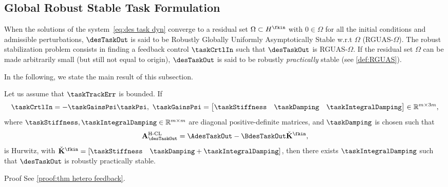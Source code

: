 \subsection{Global Robust Stable Task Formulation}\label{subsec-chap3:Robust task formulation} 
When the solutions of the system~\cref{eq:des task dyn} converge to a residual set $\Omega\subset  H^{\fkin}$ with $0\in\Omega$ for all the initial conditions and admissible perturbations,	$\desTaskOut $ is said to be Robustly Globally Uniformly Asymptotically Stable w.r.t $\Omega$ (RGUAS-$\Omega$). The robust stabilization problem consists in finding a feedback control $\taskCrtlIn$ such that $\desTaskOut $  is RGUAS-$\Omega$. 
If the residual set $\Omega$ can be made arbitrarily small (but still not equal to origin), $\desTaskOut $ is said to be robustly \emph{practically} stable (see \cref{def:RGUAS}).

In the following, we state the main result of this subsection.
\begin{theorem}\label{thm:heterogeneous feedback}
	Let us assume that $\taskTrackErr $ is bounded. If %
	\begin{equation}\label{eq:heterogeneous feedback mu}
		\taskCrtlIn = -\taskGainsPsi\taskPsi, \ \taskGainsPsi =\begin{bmatrix}
			\taskStiffness& 	\taskDamping&  \taskIntegralDamping
		\end{bmatrix}\in\mathbb{R}^{m\times3m},
	\end{equation}
	where $\taskStiffness,\taskIntegralDamping \in\mathbb{R}^{m\times m}$ are diagonal positive-definite matrices, and $\taskDamping$ is chosen such that
	\begin{equation}\label{eq:A closed-loop matrix - heterogenous feedback}
		\mathbf{A}^{\text{H-CL}}_\desTaskOut = \AdesTaskOut-\BdesTaskOut \check{\mathbf{K}}^{\fkin},
	\end{equation}  is Hurwitz, with $\check{\mathbf{K}}^{\fkin}=\left[\taskStiffness \quad \taskDamping+\taskIntegralDamping\right]$, %
	then there exists $\taskIntegralDamping$ such that $\desTaskOut $ is robustly practically stable. %
\end{theorem}
\begin{custumProof}{Proof}
	See \cref{proof:thm hetero feedback}.
\end{custumProof}

